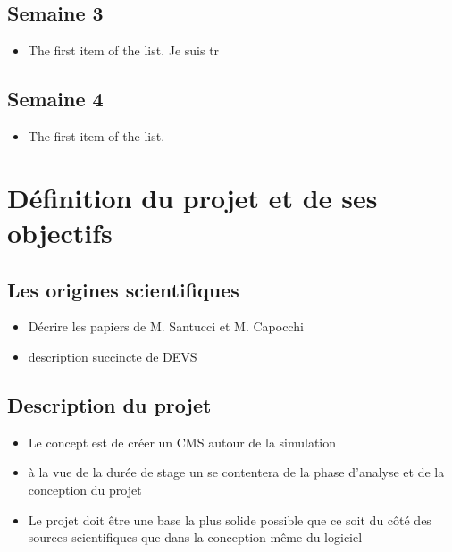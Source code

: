 \documentclass{rapport_stage}
\begin{document}
\section*{Semaine 3}

\begin{itemize}[label=$\bullet$]
  \item The first item of the list. Je suis tr
\end{itemize}

\section*{Semaine 4}

\begin{itemize}[label=$\bullet$]
  \item The first item of the list.
\end{itemize}

\chapter{Définition du projet et de ses objectifs}

\section{Les origines scientifiques}

\begin{itemize}[label=$\bullet$]
  \item Décrire les papiers de M. Santucci et M. Capocchi \cite{capocchi_devs_2022} \cite{capocchi_towards_2023}
  \item description succincte de DEVS
\end{itemize}

\section{Description du projet}

\begin{itemize}[label=$\bullet$]
  \item Le concept est de créer un CMS autour de la simulation
  \item à la vue de la durée de stage un se contentera de la phase d'analyse et de la conception du projet
  \item Le projet doit être une base la plus solide possible que ce soit du côté des sources scientifiques que dans la conception même du logiciel
\end{itemize}
\end{document}
